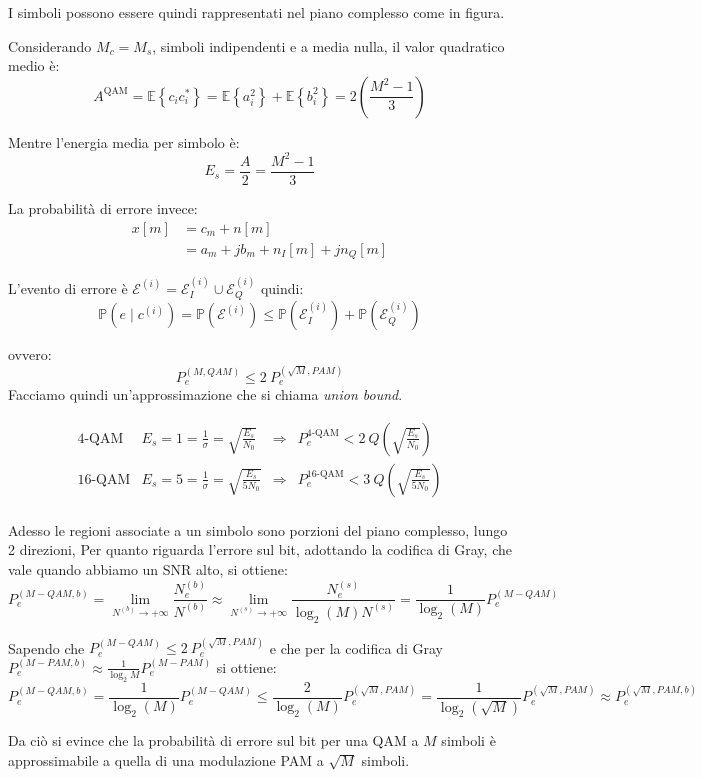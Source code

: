 I simboli possono essere quindi rappresentati nel piano complesso come in figura.

Considerando $M_c = M_s$, simboli indipendenti e a media nulla, il valor quadratico medio è:
\[
    A^{\text{QAM}} = \mathbb{E} \left\{  c_i c^*_i  \right\} = \mathbb{E} \left\{ a_i^2 \right\} + \mathbb{E} \left\{ b_i^2 \right\} = 2 \left( \frac{M^2 - 1}{3} \right)
\]

Mentre l'energia media per simbolo è:
\[
    E_s = \frac{A}{2} = \frac{M^2 - 1}{3}
\]

La probabilità di errore invece:
\begin{align*}
    x\left[ m \right] & = c_m + n \left[ m \right]                                    \\
                      & = a_m + j b_m + n_I \left[ m \right] + j n_Q \left[ m \right]
\end{align*}


L'evento di errore è $\mathcal{E}^{(i)} = \mathcal{E}_I^{(i)} \cup \mathcal{E}_Q^{(i)}$ quindi:
\[
    \mathbb{P} \left( e \mid c^{(i)} \right) = \mathbb{P} \left( \mathcal{E}^{(i)} \right) \leq \mathbb{P} \left( \mathcal{E}_I^{(i)} \right) + \mathbb{P} \left( \mathcal{E}_Q^{(i)} \right)
\]

ovvero:
\[
    P_e^{(M, QAM)} \leq 2 \ P_e^{(\sqrt{M}, PAM)}
\]
Facciamo quindi un'approssimazione che si chiama \textit{union bound}.




\[
    \begin{array}{ccccc}
        \text{4-QAM}  & E_s = 1 = \frac{1}{\sigma} = \sqrt{\frac{E_s}{N_0}}  & \Rightarrow & P_e^{\text{4-QAM}} < 2 \ Q\left(\sqrt{\frac{E_s}{N_0}}\right)   \\
        \text{16-QAM} & E_s = 5 = \frac{1}{\sigma} = \sqrt{\frac{E_s}{5N_0}} & \Rightarrow & P_e^{\text{16-QAM}} < 3 \ Q\left(\sqrt{\frac{E_s}{5N_0}}\right) \\
    \end{array}
\]

Adesso le regioni associate a un simbolo sono porzioni del piano complesso, lungo 2 direzioni,
Per quanto riguarda l'errore sul bit, adottando la codifica di Gray, che vale quando abbiamo un SNR alto, si ottiene:
\[
    P_e^{(M-QAM, b)} = \lim_{N^{(b)} \to +\infty} \frac{N_e^{(b)}}{N^{(b)}} \approx \lim_{N^{(s)} \to +\infty} \frac{N_e^{(s)}}{\log_2(M) N^{(s)}} = \frac{1}{\log_2(M)} P_e^{(M-QAM)}
\]

Sapendo che $P_e^{(M-QAM)} \leq 2 \ P_e^{(\sqrt{M}, PAM)}$ e che per la codifica di Gray $P_e^{(M-PAM, b)} \approx \frac{1}{\log_2{M}} P_e^{(M-PAM)}$ si ottiene:
\[
    P_e^{(M-QAM, b)} = \frac{1}{\log_2(M)} P_e^{(M-QAM)} \leq \frac{2}{\log_2(M)} P_e^{(\sqrt{M}, PAM)} = \frac{1}{\log_2(\sqrt{M})} P_e^{(\sqrt{M}, PAM)} \approx P_e^{(\sqrt{M}, PAM, b)}
\]

Da ciò si evince che la probabilità di errore sul bit per una QAM a $M$ simboli è approssimabile a quella di una modulazione PAM a $\sqrt{M}$ simboli.

